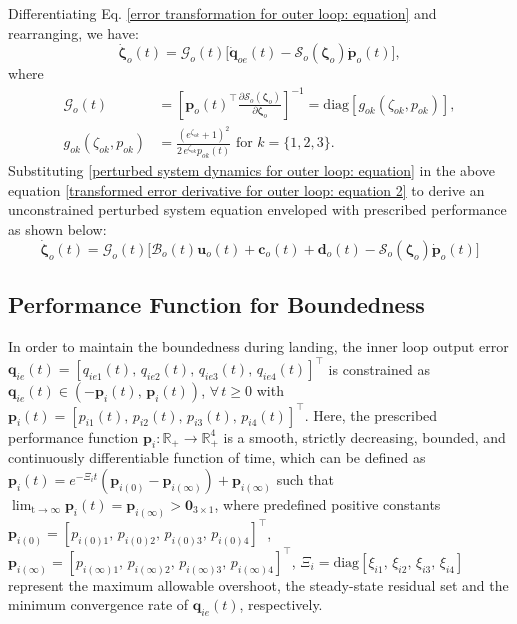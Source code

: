 \documentclass[lettersize,journal]{IEEEtran}
\begin{document}
Differentiating Eq. \eqref{error transformation for outer loop: equation} and rearranging, we have:
\begin{equation} \label{transformed error derivative for outer loop: equation 2}
    \dot{\boldsymbol{\zeta}}_o(t) = \mathcal{G}_o(t) \big[\dot{\boldsymbol{q}}_{oe}(t) - \mathcal{S}_o(\boldsymbol{\zeta}_o) \dot{\boldsymbol{p}}_o(t)\big],    
\end{equation}
where
\begin{align*}
    \mathcal{G}_o(t) &= \left[\boldsymbol{p}_o(t)^{\top} \frac{\partial \mathcal{S}_o(\boldsymbol{\zeta}_o)}{\partial \boldsymbol{\zeta}_o}\right]^{-1} = \text{diag}[g_{ok}(\zeta_{ok}, p_{ok})], \nonumber \\
    g_{ok}(\zeta_{ok}, p_{ok}) &= \frac{(e^{\zeta_{ok}}+1)^2}{2\,e^{\zeta_{ok}} p_{ok}(t)} \text{ for } k = \{1, 2, 3\}. \nonumber
\end{align*}
Substituting  \eqref{perturbed system dynamics for outer loop: equation} in the above equation \eqref{transformed error derivative for outer loop: equation 2} to derive an unconstrained perturbed system equation enveloped with prescribed performance as shown below:
\begin{equation} \label{unconstrained system for outer loop: equation}
    \dot{\boldsymbol{\zeta}}_o(t) = \mathcal{G}_o(t) \big[\mathcal{B}_o(t) \boldsymbol{u}_o(t) + \boldsymbol{c}_o(t) + \boldsymbol{d}_o(t) - \mathcal{S}_o(\boldsymbol{\zeta}_o) \dot{\boldsymbol{p}}_o(t) \big]
\end{equation}

\subsection{Performance Function for Boundedness}
In order to maintain the boundedness during landing, the inner loop output error $\boldsymbol{q}_{ie}(t) = [q_{ie 1}(t), \, q_{ie 2}(t), \, q_{ie 3}(t), \, q_{ie 4}(t)]^{\top}$ is constrained as $\boldsymbol{q}_{ie}(t) \in (- \boldsymbol{p}_i(t), \, \boldsymbol{p}_i(t))$, $\forall \, t \geq 0$ with $\boldsymbol{p}_i(t) = [p_{i 1}(t), \, p_{i 2}(t), \, p_{i 3}(t), \, p_{i 4}(t)]^{\top}$.
Here, the prescribed performance function $\boldsymbol{p}_i: \mathbb{R}_+ \rightarrow \mathbb{R}^4_+$ is a smooth, strictly decreasing, bounded, and continuously differentiable function of time, which can be defined as $\boldsymbol{p}_i(t) = e^{-\Xi_i t} (\boldsymbol{p}_{i (0)} - \boldsymbol{p}_{i (\infty)}) + \boldsymbol{p}_{i (\infty)}$ such that
$\lim_{\text{t} \to \infty} \boldsymbol{p}_i(t) = \boldsymbol{p}_{i (\infty)} > \boldsymbol{0}_{3 \times 1}$, where predefined positive constants $\boldsymbol{p}_{i (0)} = [p_{i(0) 1}, \, p_{i(0) 2}, \, p_{i(0) 3}, \, p_{i(0) 4}]^{\top}$, $\boldsymbol{p}_{i (\infty)} = [p_{i(\infty) 1}, \, p_{i(\infty) 2}, \, p_{i(\infty) 3}, \, p_{i(\infty) 4}]^{\top}$, $\Xi_i = \text{diag}[\xi_{i 1}, \, \xi_{i 2}, \, \xi_{i 3}, \, \xi_{i 4}]$ represent the maximum allowable overshoot, the steady-state residual set and the minimum convergence rate of $\boldsymbol{q}_{ie}(t)$, respectively.
\end{document}
